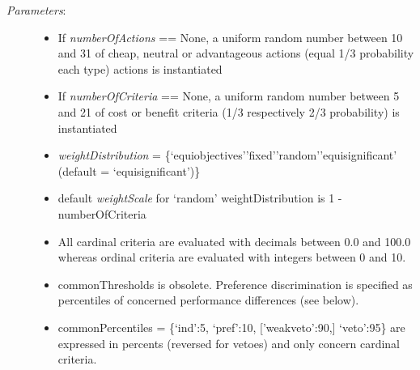 \documentclass[letterpaper,10pt,english]{sphinxmanual}
\begin{document}
\begin{description}
\item[{\emph{Parameters}:}] \leavevmode\begin{itemize}
\item {} 
If \emph{numberOfActions} == None, a uniform random number between 10 and 31 of cheap, neutral or advantageous actions (equal 1/3 probability each type) actions is instantiated

\item {} 
If \emph{numberOfCriteria} == None, a uniform random number between 5 and 21 of cost or benefit criteria (1/3 respectively 2/3 probability) is instantiated

\item {} 
\emph{weightDistribution} = \{`equiobjectives'\textbar{}'fixed'\textbar{}'random'\textbar{}'equisignificant' (default = `equisignificant')\}

\item {} 
default \emph{weightScale} for `random' weightDistribution is 1 - numberOfCriteria

\item {} 
All cardinal criteria are evaluated with decimals between 0.0 and 100.0 whereas ordinal criteria are evaluated with integers between 0 and 10.

\item {} 
commonThresholds is obsolete. Preference discrimination is specified as percentiles of concerned performance differences (see below).

\item {} 
commonPercentiles = \{`ind':5, `pref':10, {[}'weakveto':90,{]} `veto':95\} are expressed in percents (reversed for vetoes) and only concern cardinal criteria.

\end{itemize}

\end{description}
\end{document}
